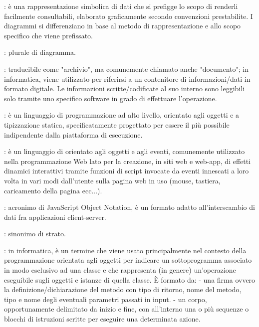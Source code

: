 {		: è una rappresentazione simbolica di dati che si prefigge lo scopo di renderli facilmente consultabili, elaborato graficamente secondo convenzioni prestabilite. I diagrammi si differenziano in base al metodo di rappresentazione e allo scopo specifico che viene prefissato.
	
		: plurale di diagramma.

	
		: traducibile come "archivio", ma comunemente chiamato anche "documento"; in informatica, viene utilizzato per riferirsi a un contenitore di informazioni/dati in formato digitale. Le informazioni scritte/codificate al suo interno sono leggibili solo tramite uno specifico software in grado di effettuare l'operazione.
	
	
		: è un linguaggio di programmazione ad alto livello, orientato agli oggetti e a tipizzazione statica, specificatamente progettato per essere il più possibile indipendente dalla piattaforma di esecuzione.
	
		: è un linguaggio di  orientato agli oggetti e agli eventi, comunemente utilizzato nella programmazione Web lato  per la creazione, in siti web e web-app, di effetti dinamici interattivi tramite funzioni di script invocate da eventi innescati a loro volta in vari modi dall'utente sulla pagina web in uso (mouse, tastiera, caricamento della pagina ecc...).
	
		: acronimo di JavaScript Object Notation, è un formato adatto all'interscambio di dati fra applicazioni client-server.
	
	
		: sinonimo di strato.
	
	
		: in informatica, è un termine che viene usato principalmente nel contesto della programmazione orientata agli oggetti per indicare un sottoprogramma associato in modo esclusivo ad una classe e che rappresenta (in genere) un'operazione eseguibile sugli oggetti e istanze di quella classe. È formato da:
- una firma ovvero la definizione/dichiarazione del metodo con tipo di ritorno, nome del metodo, tipo e nome degli eventuali parametri passati in input.
- un corpo, opportunamente delimitato da inizio e fine, con all'interno una o più sequenze o blocchi di istruzioni scritte per eseguire una determinata azione.

}
